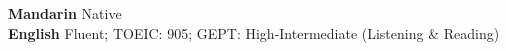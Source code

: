 

\begin{cvparagraph}

\textbf{Mandarin}
  \hfill{Native} \\
\textbf{English}
  \hfill{Fluent; TOEIC: 905; GEPT: High-Intermediate (Listening \& Reading)} \\
\end{cvparagraph}

